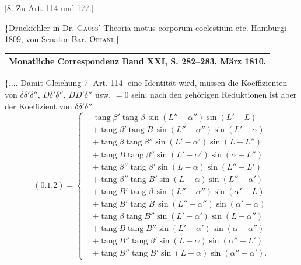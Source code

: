 \begin{center}
[8. Zu Art. 114 und 177.]
\end{center}
\begin{center}
\{Druckfehler in Dr. \textsc{Gauss}' Theoria motus corporum coelestium etc. Hamburgi 1809, von Senator Bar. \textsc{Oriani}.\}
\end{center}
\begin{center}
\begin{tabular}{c}\hline
\small Monatliche Correspondenz Band XXI, S. 282--283, März 1810.\\\hline
\end{tabular}
\end{center}
\{.... Damit Gleichung 7 [Art. 114] eine Identität wird, müssen die Koeffizienten von \(\delta\delta'\delta''\), \(D\delta'\delta''\), \(DD'\delta''\) usw. \(=0\) sein; nach den gehörigen Reduktionen ist aber der Koeffizient von \(\delta\delta'\delta''\)
\[
(0.1.2)=\left\{\begin{aligned}
&\operatorname{tang}\beta'\operatorname{tang}\beta\,\sin(L''-\alpha'')\sin(L'-L)\\
&+\operatorname{tang}\beta'\operatorname{tang}B\,\sin(L''-\alpha'')\sin(L'-\alpha)\\
&+\operatorname{tang}\beta\operatorname{tang}\beta''\sin(L'-\alpha')\sin(L-L'')\\
&+\operatorname{tang}B\operatorname{tang}\beta''\sin(L'-\alpha')\sin(\alpha-L'')\\
&+\operatorname{tang}\beta''\operatorname{tang}\beta'\sin(L-\alpha)\sin(L''-L')\\
&+\operatorname{tang}\beta''\operatorname{tang}B'\sin(L-\alpha)\sin(L''-\alpha')\\
&+\operatorname{tang}B'\operatorname{tang}\beta\,\sin(L''-\alpha'')\sin(\alpha'-L)\\
&+\operatorname{tang}B'\operatorname{tang}B\,\sin(L''-\alpha'')\sin(\alpha'-\alpha)\\
&+\operatorname{tang}\beta\operatorname{tang}B''\sin(L'-\alpha')\sin(L-\alpha'')\\
&+\operatorname{tang}B\operatorname{tang}B''\sin(L'-\alpha')\sin(\alpha-\alpha'')\\
&+\operatorname{tang}B''\operatorname{tang}\beta'\sin(L-\alpha)\sin(\alpha''-L')\\
&+\operatorname{tang}B''\operatorname{tang}B'\sin(L-\alpha)\sin(\alpha''-\alpha').
\end{aligned}\right.
\]
